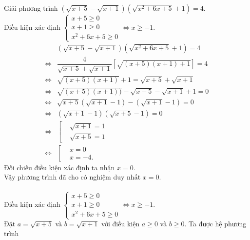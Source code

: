 \begin{bt}%
	Giải phương trình $\left( \sqrt{x + 5} - \sqrt{x + 1} \right)\left( \sqrt{x^2 + 6x + 5} + 1 \right) = 4$.
	\loigiai
	{
		\\
		Điều kiện xác định $\begin{cases} x + 5 \geq 0 \\ x + 1 \geq 0 \\ x^2 + 6x + 5 \geq 0  \end{cases} \Leftrightarrow x \geq -1$.
		\begin{align*}
		& \left( \sqrt{x + 5} - \sqrt{x + 1} \right)\left( \sqrt{x^2 + 6x + 5} + 1 \right) = 4 \\
		\Leftrightarrow & \dfrac{4}{\sqrt{x + 5} + \sqrt{x + 1}} \left[ \sqrt{(x + 5)(x + 1) + 1} \right] = 4 \\
		\Leftrightarrow & \sqrt{(x + 5)(x + 1)} + 1 = \sqrt{x + 5} + \sqrt{x + 1} \\
		\Leftrightarrow & \sqrt{(x + 5)(x + 1))} - \sqrt{x + 5} - \sqrt{x + 1} + 1 = 0 \\
		\Leftrightarrow & \sqrt{x + 5} \left( \sqrt{x + 1} - 1 \right) - \left( \sqrt{x + 1} - 1 \right) = 0 \\
		\Leftrightarrow & \left( \sqrt{x + 1} - 1 \right) \left( \sqrt{x + 5} - 1 \right) = 0 \\
		\Leftrightarrow & \left[\begin{aligned} & \sqrt{x + 1} = 1 \\& \sqrt{x + 5} = 1  \end{aligned}\right. \\
		\Leftrightarrow & \left[\begin{aligned} & x = 0 \\& x = -4.  \end{aligned}\right.
		\end{align*}
		Đối chiếu điều kiện xác định ta nhận $x = 0$.\\
		Vậy phương trình đã cho có nghiệm duy nhất $x = 0$.\\
		\\
		Điều kiện xác định $\begin{cases} x + 5 \geq 0 \\ x + 1 \geq 0 \\ x^2 + 6x + 5 \geq 0  \end{cases} \Leftrightarrow x \geq -1$.\\
		Đặt $a = \sqrt{x + 5}$ và $b = \sqrt{x + 1}$ với điều kiện $a \geq 0$ và $b \geq 0$. Ta được hệ phương trình
}
\end{bt}
